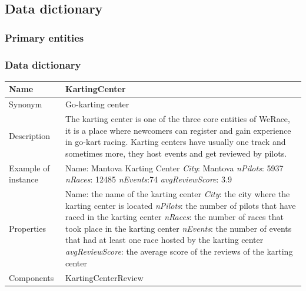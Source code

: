 \documentclass{beamer}
\newcommand{\kc}{WeRace}
\begin{document}



\subsection{Data dictionary}

\subsubsection{Primary entities}

\begin{frame}
\frametitle{Data dictionary}


\begin{table}
\tiny
\begin{tabular}{|p{2cm}|p{6cm}|}
\hline
Name & \textbf{KartingCenter} \\
\hline
Synonym & Go-karting center \\
\hline
Description & The karting center is one of the three core entities of \kc{},
it is a place where newcomers can register and gain experience in go-kart racing.
Karting centers have usually one track and sometimes more, they host events and 
get reviewed by pilots. \\
\hline
Example of instance & 
Name: Mantova Karting Center \newline
\textit{City}: Mantova \newline
\textit{nPilots}: 5937 \newline
\textit{nRaces}: 12485 \newline
\textit{nEvents}:74 \newline
\textit{avgReviewScore}: 3.9 \\
\hline
Properties & 
Name: the name of the karting center\newline
\textit{City}: the city where the karting center is located\newline
\textit{nPilots}: the number of pilots that have raced in the karting center \newline
\textit{nRaces}: the number of races that took place in the karting center \newline
\textit{nEvents}: the number of events that had at least one race hosted by the karting center \newline
\textit{avgReviewScore}: the average score of the reviews of the karting center \\
\hline
Components & KartingCenterReview \\
\hline
\end{tabular}
\end{table}

\end{frame}
\end{document}
